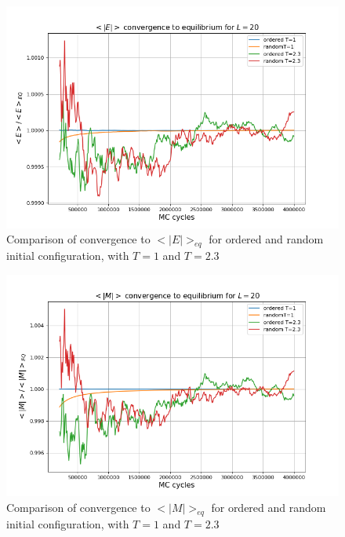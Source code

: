\documentclass[%
oneside,                 %
final,                   %
10pt]{article}
\begin{document}
\begin{figure}[!htb]
        \centering 
         \includegraphics[scale=.45]{../Results/Econvergence.png} 
        \caption{Comparison of convergence to $<|E|>_{eq}$ for ordered and random initial configuration, with $T=1$ and $T=2.3$}
        \label{fig:SPIN.E.convergence}   
\end{figure} 

\begin{figure}[!htb]
        \centering 
         \includegraphics[scale=.45]{../Results/Mconvergence.png} 
        \caption{Comparison of convergence to $<|M|>_{eq}$ for ordered and random initial configuration, with $T=1$ and $T=2.3$}
        \label{fig:SPIN.M.convergence}   
\end{figure} 
\end{document}
